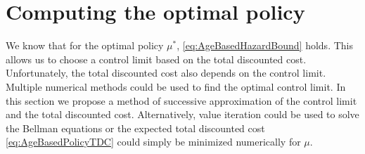 \section{Computing the optimal policy}\label{section:AgeBasedOptimalPolicyComputation}
We know that for the optimal policy $\mu^*$, \eqref{eq:AgeBasedHazardBound} holds.
This allows us to choose a control limit based on the total discounted cost.
Unfortunately, the total discounted cost also depends on the control limit.
Multiple numerical methods could be used to find the optimal control limit.
In this section we propose a method of successive approximation of the control limit and the total discounted cost.
Alternatively, value iteration could be used to solve the Bellman equations or the expected total discounted cost \eqref{eq:AgeBasedPolicyTDC} could simply be minimized numerically for $\mu$.

